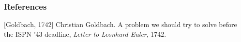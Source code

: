 \begin{frame}
\frametitle{References}
\label{slide:references}
\begin{thebibliography}{10}
[Goldbach, 1742]
Christian Goldbach.
\newblock A problem we should try to solve before the ISPN ’43 deadline,
\newblock \emph{Letter to Leonhard Euler}, 1742.
\end{thebibliography}
\end{frame}
